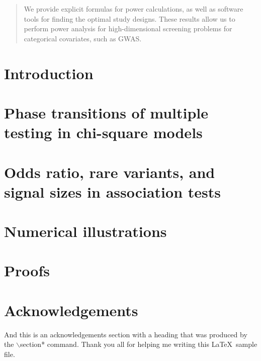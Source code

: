 \documentclass[ejs]{imsart}
\numberwithin{equation}{section}
\theoremstyle{plain}
\theoremstyle{remark}
\begin{document}
\begin{frontmatter}
\begin{abstract}
We provide explicit formulas for power calculations, as well as software tools for finding the optimal study designs.
These results allow us to perform power analysis for high-dimensional screening problems for categorical covariates, such as GWAS.
\end{abstract}

\begin{keyword}[class=MSC]
\end{keyword}

\begin{keyword}
\end{keyword}
\tableofcontents
\end{frontmatter}

\section{Introduction}
\label{sec:intro}


\section{Phase transitions of multiple testing in chi-square models}
\label{sec:chisq-boundaries}


\section{Odds ratio, rare variants, and signal sizes in association tests}
\label{sec:signal-size-odds-ratio}


\section{Numerical illustrations}
\label{sec:numerical}


\appendix
\section{Proofs}
\label{sec:proofs}



\section*{Acknowledgements}
And this is an acknowledgements section with a heading that was produced by the
$\backslash$section* command. Thank you all for helping me writing this
\LaTeX\ sample file.
\end{document}
